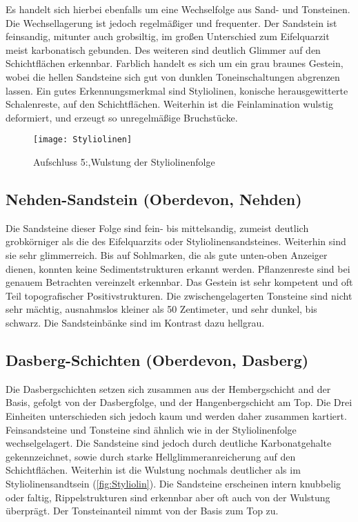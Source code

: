 Es handelt sich hierbei ebenfalls um eine Wechselfolge aus Sand- und Tonsteinen. Die Wechsellagerung ist jedoch regelmäßiger und frequenter. Der Sandstein ist feinsandig, mitunter auch grobsiltig, im großen Unterschied zum Eifelquarzit meist karbonatisch gebunden. Des weiteren sind deutlich Glimmer auf den Schichtflächen erkennbar. Farblich handelt es sich um ein grau braunes Gestein, wobei die hellen Sandsteine sich gut von dunklen Toneinschaltungen abgrenzen lassen. Ein gutes Erkennungsmerkmal sind Styliolinen, konische herausgewitterte Schalenreste, auf den Schichtflächen. Weiterhin ist die Feinlamination wulstig deformiert, und erzeugt so unregelmäßige Bruchstücke. 

\begin{figure}[!htb]
\centering
\texttt{[image: Styliolinen]}
\caption{Aufschluss 5:,Wulstung der Styliolinenfolge}
\label{fig:Styliolin}
\end{figure} 


\subsection{Nehden-Sandstein (Oberdevon, Nehden)}
Die Sandsteine dieser Folge sind fein- bis mittelsandig, zumeist deutlich grobkörniger als die des Eifelquarzits oder Styliolinensandsteines. Weiterhin sind sie sehr glimmerreich. Bis auf Sohlmarken, die als gute unten-oben Anzeiger dienen, konnten keine Sedimentstrukturen erkannt werden. Pflanzenreste sind bei genauem Betrachten vereinzelt erkennbar. Das Gestein ist sehr kompetent und oft Teil topografischer Positivstrukturen. Die zwischengelagerten Tonsteine sind nicht sehr mächtig, ausnahmslos kleiner als 50 Zentimeter, und sehr dunkel, bis schwarz. Die Sandsteinbänke sind im Kontrast dazu hellgrau. 


\subsection{Dasberg-Schichten (Oberdevon, Dasberg)}

Die Dasbergschichten setzen sich zusammen aus der Hembergschicht and der Basis, gefolgt von der Dasbergfolge, und der Hangenbergschicht am Top. Die Drei Einheiten unterschieden sich jedoch kaum und werden daher zusammen kartiert. Feinsandsteine und Tonsteine sind ähnlich wie in der Styliolinenfolge wechselgelagert. Die Sandsteine sind jedoch durch deutliche Karbonatgehalte gekennzeichnet, sowie durch starke Hellglimmeranreicherung auf den Schichtflächen. Weiterhin ist die Wulstung nochmals deutlicher als im Styliolinensandtsein (\autoref{fig:Styliolin}). Die Sandsteine erscheinen intern knubbelig oder faltig, Rippelstrukturen sind erkennbar aber oft auch von der Wulstung überprägt. Der Tonsteinanteil nimmt von der Basis zum Top zu. 
\cite{hoelting12,eckel14,mesch15,vinx15,MiGe15,Hydrod16,grotzinger17,franke17,eckel14,NaCl2,Gneiss}

